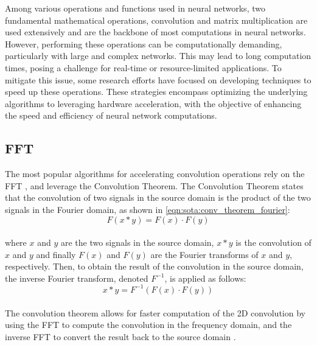 Among various operations and functions used in neural networks, two fundamental
mathematical operations, convolution and matrix multiplication are used
extensively and are the backbone of most computations in neural networks.
However, performing these operations can be computationally demanding,
particularly with large and complex networks. This may lead to long computation
times, posing a challenge for real-time or resource-limited applications. To
mitigate this issue, some research efforts have focused on developing techniques
to speed up these operations. These strategies encompass optimizing the
underlying algorithms to leveraging hardware acceleration, with the objective of
enhancing the speed and efficiency of neural network computations.\\


\subsection{\acl{FFT}}\label{sec:sota:fft}
The most popular algorithms for
accelerating convolution operations rely on the \ac{FFT}
\cite{DBLP:conf/nips/ChiJM20,DBLP:journals/npl/LinY19,DBLP:conf/pkdd/PrattWCZ17},
and leverage the Convolution Theorem. The Convolution Theorem states that the
convolution of two signals in the source domain is the product of the two
signals in the Fourier domain, as shown in \cref{eqn:sota:conv_theorem_fourier}:\\

\begin{equation}
  \label{eqn:sota:conv_theorem_fourier}
  F(x * y) = F(x) \cdot F(y)
\end{equation}\\

\noindent where $x$ and $y$ are the two signals in the source domain, $x*y$ is
the convolution of $x$ and $y$ and finally $F(x)$ and $F(y)$ are the Fourier
transforms of $x$ and $y$, respectively. Then, to obtain the result of the
convolution in the source domain, the inverse Fourier transform, denoted
$F^{-1}$, is applied as follows:\\

\begin{equation}
  x * y = F^{-1}(F(x) \cdot F(y))
\end{equation}\\

\noindent The convolution theorem allows for faster computation of the 2D
convolution by using the \ac{FFT} to compute the convolution in the frequency
domain, and the inverse \ac{FFT} to convert the result back to the source domain
\cite{oppenheim1997signals}.


